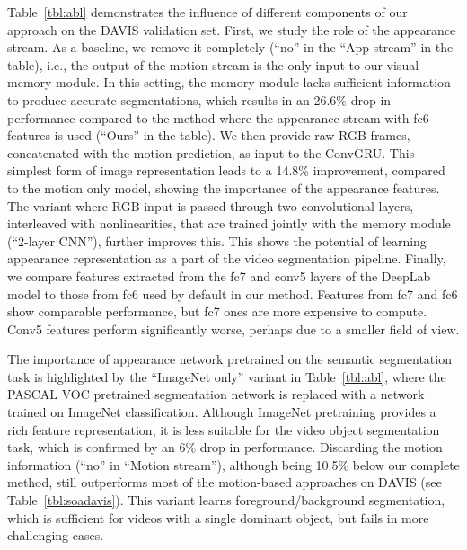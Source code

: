 \documentclass[10pt,twocolumn,letterpaper]{article}
\begin{document}
Table~\ref{tbl:abl} demonstrates the influence of different components of our
approach on the DAVIS validation set. First, we study the role of the
appearance stream. As a baseline, we remove it completely (``no'' in the ``App
stream'' in the table), i.e., the output of the motion stream is the only input
to our visual memory module. In this setting, the memory module lacks
sufficient information to produce accurate segmentations, which results in an
26.6\% drop in performance compared to the method where the appearance stream
with fc6 features is used (``Ours'' in the table). We then provide raw RGB
frames, concatenated with the motion prediction, as input to the ConvGRU. This
simplest form of image representation leads to a 14.8\% improvement, compared
to the motion only model, showing the importance of the appearance features.
The variant where RGB input is passed through two convolutional layers,
interleaved with  nonlinearities, that are trained jointly with the
memory module (``2-layer CNN''), further improves this. This shows the
potential of learning appearance representation as a part of the video
segmentation pipeline. Finally, we compare features extracted from the fc7 and
conv5 layers of the DeepLab model to those from fc6 used by default in our
method. Features from fc7 and fc6 show comparable performance, but fc7 ones are
more expensive to compute. Conv5 features perform significantly worse, perhaps
due to a smaller field of view.

The importance of appearance network pretrained on the semantic segmentation
task is highlighted by the ``ImageNet only'' variant in Table~\ref{tbl:abl},
where the PASCAL VOC pretrained segmentation network is replaced with a network
trained on ImageNet classification. Although ImageNet pretraining provides a
rich feature representation, it is less suitable for the video object
segmentation task, which is confirmed by an 6\% drop in performance. Discarding
the motion information (``no'' in ``Motion stream''), although being 10.5\%
below our complete method, still outperforms most of the motion-based
approaches on DAVIS (see Table~\ref{tbl:soadavis}). This variant learns
foreground/background segmentation, which is sufficient for videos with a
single dominant object, but fails in more challenging cases.
\end{document}

